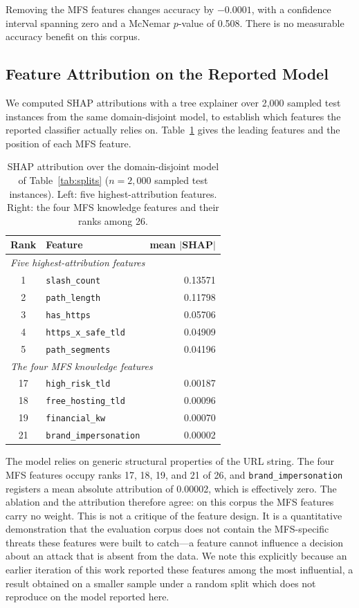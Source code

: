 \documentclass[manuscript,screen,review]{acmart}
\begin{document}
Removing the MFS features changes accuracy by $-0.0001$, with a confidence interval spanning zero and a McNemar $p$-value of 0.508. There is no measurable accuracy benefit on this corpus.

\subsection{Feature Attribution on the Reported Model}
We computed SHAP attributions with a tree explainer over 2{,}000 sampled test instances from the same domain-disjoint model, to establish which features the reported classifier actually relies on. Table~\ref{tab:shap} gives the leading features and the position of each MFS feature.

\begin{table}[t]
\centering
\caption{SHAP attribution over the domain-disjoint model of Table~\ref{tab:splits} ($n=2{,}000$ sampled test instances). Left: five highest-attribution features. Right: the four MFS knowledge features and their ranks among 26.}
\label{tab:shap}
\small
\begin{tabular}{clr}
\toprule
Rank & Feature & mean $|$SHAP$|$ \\
\midrule
\multicolumn{3}{l}{\emph{Five highest-attribution features}} \\
1 & \texttt{slash\_count} & 0.13571 \\
2 & \texttt{path\_length} & 0.11798 \\
3 & \texttt{has\_https} & 0.05706 \\
4 & \texttt{https\_x\_safe\_tld} & 0.04909 \\
5 & \texttt{path\_segments} & 0.04196 \\
\midrule
\multicolumn{3}{l}{\emph{The four MFS knowledge features}} \\
17 & \texttt{high\_risk\_tld} & 0.00187 \\
18 & \texttt{free\_hosting\_tld} & 0.00096 \\
19 & \texttt{financial\_kw} & 0.00070 \\
21 & \texttt{brand\_impersonation} & 0.00002 \\
\bottomrule
\end{tabular}
\end{table}

The model relies on generic structural properties of the URL string. The four MFS features occupy ranks 17, 18, 19, and 21 of 26, and \texttt{brand\_impersonation} registers a mean absolute attribution of 0.00002, which is effectively zero. The ablation and the attribution therefore agree: on this corpus the MFS features carry no weight. This is not a critique of the feature design. It is a quantitative demonstration that the evaluation corpus does not contain the MFS-specific threats these features were built to catch---a feature cannot influence a decision about an attack that is absent from the data. We note this explicitly because an earlier iteration of this work reported these features among the most influential, a result obtained on a smaller sample under a random split which does not reproduce on the model reported here.
\end{document}
